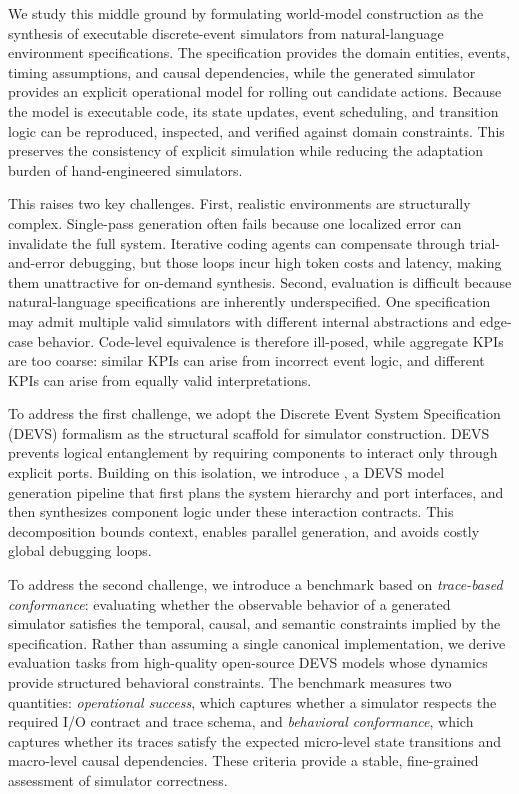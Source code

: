 We study this middle ground by formulating world-model construction as the synthesis of executable discrete-event simulators from natural-language environment specifications. The specification provides the domain entities, events, timing assumptions, and causal dependencies, while the generated simulator provides an explicit operational model for rolling out candidate actions. Because the model is executable code, its state updates, event scheduling, and transition logic can be reproduced, inspected, and verified against domain constraints. This preserves the consistency of explicit simulation while reducing the adaptation burden of hand-engineered simulators.


This raises two key challenges. First, realistic environments are structurally complex. Single-pass generation often fails because one localized error can invalidate the full system. Iterative coding agents can compensate through trial-and-error debugging, but those loops incur high token costs and latency, making them unattractive for on-demand synthesis. Second, evaluation is difficult because natural-language specifications are inherently underspecified. One specification may admit multiple valid simulators with different internal abstractions and edge-case behavior. Code-level equivalence is therefore ill-posed, while aggregate KPIs are too coarse: similar KPIs can arise from incorrect event logic, and different KPIs can arise from equally valid interpretations.

To address the first challenge, we adopt the Discrete Event System Specification (DEVS) formalism \cite{zeigler2000theory,RiscoMartin2023xDEVS} as the structural scaffold for simulator construction. DEVS prevents logical entanglement by requiring components to interact only through explicit ports. Building on this isolation, we introduce \methodname{}, a DEVS model generation pipeline that first plans the system hierarchy and port interfaces, and then synthesizes component logic under these interaction contracts. This decomposition bounds context, enables parallel generation, and avoids costly global debugging loops.

To address the second challenge, we introduce a benchmark based on \emph{trace-based conformance}: evaluating whether the observable behavior of a generated simulator satisfies the temporal, causal, and semantic constraints implied by the specification. Rather than assuming a single canonical implementation, we derive evaluation tasks from high-quality open-source DEVS models whose dynamics provide structured behavioral constraints. The benchmark measures two quantities: \emph{operational success}, which captures whether a simulator respects the required I/O contract and trace schema, and \emph{behavioral conformance}, which captures whether its traces satisfy the expected micro-level state transitions and macro-level causal dependencies. These criteria provide a stable, fine-grained assessment of simulator correctness.

